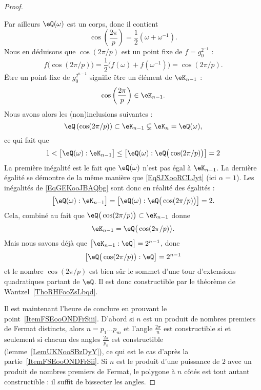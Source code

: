 \begin{proof}
\begin{subproof}
\begin{subproof}
			Par ailleurs \( \eQ(\omega)\) est un corps, donc il contient
			\begin{equation}
				\cos\left( \frac{ 2\pi }{ p } \right)=\frac{ 1 }{2}(\omega+\omega^{-1}).
			\end{equation}
            Nous en déduisons que \( \cos(2\pi/p)\) est un point fixe de \( f=g_0^{2^{-1}}\) :
			\begin{equation}
				f\big( \cos(2\pi/p) \big)=\frac{ 1 }{2}\big( f(\omega)+f(\omega^{-1}) \big)=\cos(2\pi/p).
			\end{equation}
			Être un point fixe de \( g_0^{2^{n-1}}\) signifie être un élément de \( \eK_{n-1}\) :
			\begin{equation}
				\cos\left( \frac{ 2\pi }{ p } \right)\in \eK_{n-1}.
			\end{equation}
			Nous avons alors les (non)inclusions suivantes :
			\begin{equation}
				\eQ\left( \cos(2\pi/p) \right)\subset \eK_{n-1}\varsubsetneq \eK_n=\eQ(\omega),
			\end{equation}
			ce qui fait que
			\begin{equation}    \label{EqGEKooJBAQbg}
				1<\big[ \eQ(\omega):\eK_{n-1} \big]\leq\big[ \eQ(\omega):\eQ\big( \cos(2\pi/p) \big) \big]=2
			\end{equation}
			La première inégalité est le fait que \( \eQ(\omega)\) n'est pas égal à \( \eK_{n-1}\). La dernière égalité se démontre de la même manière que \eqref{EqSJXooRCLJyt} (ici \( \alpha=1\)). Les inégalités de \eqref{EqGEKooJBAQbg} sont donc en réalité des égalités :
			\begin{equation}
				\big[ \eQ(\omega):\eK_{n-1} \big]=\big[ \eQ(\omega):\eQ\big( \cos(2\pi/p) \big) \big]=2.
			\end{equation}
			Cela, combiné au fait que \( \eQ\big( \cos(2\pi/p) \big)\subset \eK_{n-1}\) donne
			\begin{equation}
				\eK_{n-1}=\eQ\big( \cos(2\pi/p) \big).
			\end{equation}
			Mais nous savons déjà que \( \big[ \eK_{n-1}:\eQ \big]=2^{n-1}\), donc
			\begin{equation}
				\big[ \eQ\big( \cos(2\pi/p) \big):\eQ \big]=2^{n-1}
			\end{equation}
			et le nombre \( \cos(2\pi/p)\) est bien sûr le sommet d'une tour d'extensions quadratiques partant de \( \eQ\). Il est donc constructible par le théorème de Wantzel~\ref{ThoRHFooZsLbqd}.
		\end{subproof}
	\end{subproof}
	Il est maintenant l'heure de conclure en prouvant le point~\ref{ItemFSEooONDFrSiii}. D'abord si \( n\) est un produit de nombres premiers de Fermat distincts, alors \( n=p_1\ldots p_m\) et l'angle \( \frac{ 2\pi }{ n }\) est constructible si et seulement si chacun des angles \( \frac{ 2\pi }{ p_k }\) est constructible (lemme~\ref{LemUKNooSBzDyY}), ce qui est le cas d'après la partie~\ref{ItemFSEooONDFrSii}. Si \( n\) est le produit d'une puissance de \( 2\) avec un produit de nombres premiers de Fermat, le polygone à \( n\) côtés est tout autant constructible : il suffit de bissecter les angles.


\end{proof}
